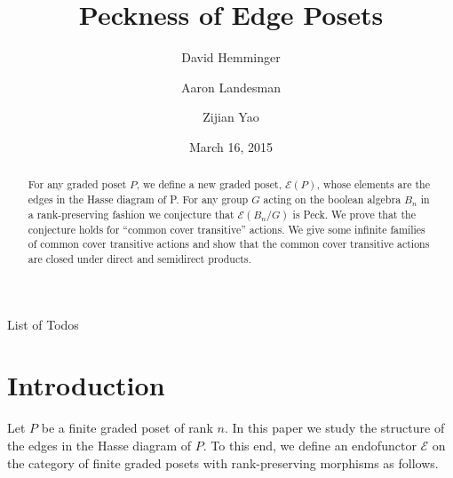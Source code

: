\documentclass[smallextended, envcountsame, numbook]{svjour3}
\makeatletter
\theoremstyle{plain}
\theoremstyle{definition}
\theoremstyle{remark}
\numberwithin{equation}{section}
\def\listtodoname{List of Todos}
\def\listoftodos{\@starttoc{tdo}\listtodoname}
\makeatother
\begin{document}
\title{Peckness of Edge Posets}

\author{David Hemminger      \and
        Aaron Landesman 		 \and
        Zijian Yao
}


\date{March 16, 2015}


\maketitle



\begin{abstract}
For any graded poset $P$, we define a new graded poset, $\mathcal E(P)$, whose elements are the edges in the Hasse diagram of P. For any group $G$ acting on the boolean algebra $B_n$ in a rank-preserving fashion we conjecture that $\mathcal E(B_n/G)$ is Peck. We prove that the conjecture holds for ``common cover transitive'' actions. We give some infinite families of common cover transitive actions and show that the common cover transitive actions are closed under direct and semidirect products.

\end{abstract}
\listoftodos

\newpage


\section{Introduction}\label{sec:introduction}


Let $P$ be a finite graded poset of rank $n$.  In this paper we study the structure of the edges in the Hasse diagram of $P$.  To this end, we define an endofunctor $\mathcal{E}$ on the category of finite graded posets with rank-preserving morphisms as follows.
\end{document}
